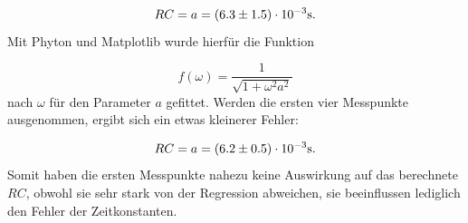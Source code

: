 \begin{equation*}
	\centering
	RC = a =(6.3 \pm 1.5)\cdot 10^{-3} \si{\second} .
\end{equation*}
Mit Phyton und Matplotlib \cite{matplotlib} wurde hierfür die Funktion

\begin{equation*}
	f(\omega)=\frac{1}{\sqrt{1 +\omega^2 a^2}}
\end{equation*}
nach $\omega$ für den Parameter $a$ gefittet.
Werden die ersten vier Messpunkte ausgenommen, ergibt sich ein etwas kleinerer Fehler:

\begin{equation*}
	\centering
	RC = a =(6.2 \pm 0.5)\cdot 10^{-3} \si{\second} .
\end{equation*}
Somit haben die ersten Messpunkte nahezu keine Auswirkung auf das berechnete $RC$, obwohl sie sehr stark von der Regression abweichen, sie beeinflussen lediglich den Fehler der Zeitkonstanten.
